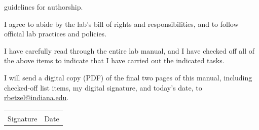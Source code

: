\documentclass{tufte-book} %
\begin{document}
\begin{todolist}
{ guidelines for authorship}.
 \item I agree to abide by the lab's bill of rights and responsibilities, and to follow official lab practices and policies.
 \item I have carefully read through the entire lab manual, and I have checked off all of the above items to indicate that I have carried out the indicated tasks.
 \item I will send a digital copy (PDF) of the final two pages of this manual, including checked-off list items, my digital signature, and today's date, to \href{mailto:rbetzel@indiana.edu}{rbetzel@indiana.edu}.
\end{todolist}

\vspace{1in}
\begin{tabular}{@{}p{3in}p{1in}@{}}
\hrulefill & \hrulefill \\
Signature & Date\\
\end{tabular}





\backmatter




\printindex %
\end{document}
